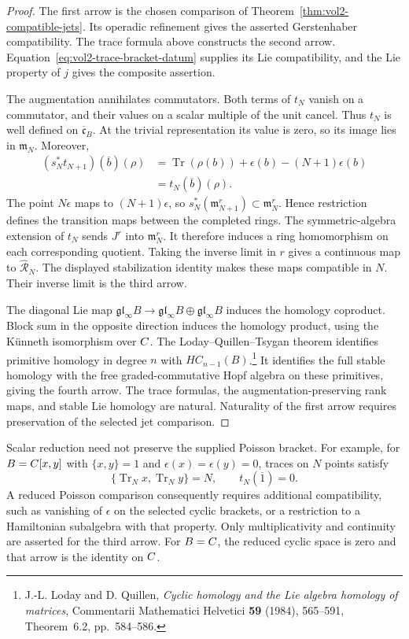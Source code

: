\begin{proof}
The first arrow is the chosen comparison of
Theorem~\ref{thm:vol2-compatible-jets}.
Its operadic refinement gives the asserted Gerstenhaber compatibility.
The trace formula above constructs the second arrow.
Equation~\eqref{eq:vol2-trace-bracket-datum} supplies its Lie compatibility,
and the Lie property of $j$ gives the composite assertion.

The augmentation annihilates commutators.
Both terms of $t_N$ vanish on a commutator, and their values on a scalar
multiple of the unit cancel.
Thus $t_N$ is well defined on $\overline{\mathfrak c}_B$.
At the trivial representation its value is zero, so its image lies in $\mathfrak m_N$.
Moreover,
\[
\begin{split}
 (s_N^*t_{N+1})(\overline b)(\rho)
 &=\operatorname{Tr}(\rho(b))+\epsilon(b)-(N+1)\epsilon(b)\\
 &=t_N(\overline b)(\rho).
\end{split}
\]
The point $N\epsilon$ maps to $(N+1)\epsilon$, so
$s_N^*(\mathfrak m_{N+1}^r)\subset\mathfrak m_N^r$.
Hence restriction defines the transition maps between the completed rings.
The symmetric-algebra extension of $t_N$ sends $J^r$ into $\mathfrak m_N^r$.
It therefore induces a ring homomorphism on each corresponding quotient.
Taking the inverse limit in $r$ gives a continuous map to
$\widehat{\mathcal R}_N$.
The displayed stabilization identity makes these maps compatible in $N$.
Their inverse limit is the third arrow.

The diagonal Lie map
$\mathfrak{gl}_\infty B\to
 \mathfrak{gl}_\infty B\oplus\mathfrak{gl}_\infty B$
induces the homology coproduct.
Block sum in the opposite direction induces the homology product,
using the K\"unneth isomorphism over $C$.
The Loday--Quillen--Tsygan theorem identifies primitive homology
in degree $n$ with $HC_{n-1}(B)$.\footnote{J.-L. Loday and D. Quillen,
\emph{Cyclic homology and the Lie algebra homology of matrices},
Commentarii Mathematici Helvetici \textbf{59} (1984), 565--591,
Theorem~6.2, pp.~584--586.}
It identifies the full stable homology with the free graded-commutative
Hopf algebra on these primitives, giving the fourth arrow.
The trace formulas, the augmentation-preserving rank maps, and stable
Lie homology are natural.
Naturality of the first arrow requires preservation of the selected jet comparison.
\end{proof}

Scalar reduction need not preserve the supplied Poisson bracket.
For example, for $B=C[x,y]$ with $\{x,y\}=1$ and
$\epsilon(x)=\epsilon(y)=0$, traces on $N$ points satisfy
\[
 \{\operatorname{Tr}_Nx,\operatorname{Tr}_Ny\}=N,
 \qquad t_N(\overline1)=0.
\]
A reduced Poisson comparison consequently requires additional compatibility,
such as vanishing of $\epsilon$ on the selected cyclic brackets,
or a restriction to a Hamiltonian subalgebra with that property.
Only multiplicativity and continuity are asserted for the third arrow.
For $B=C$, the reduced cyclic space is zero and that arrow is the identity on $C$.

